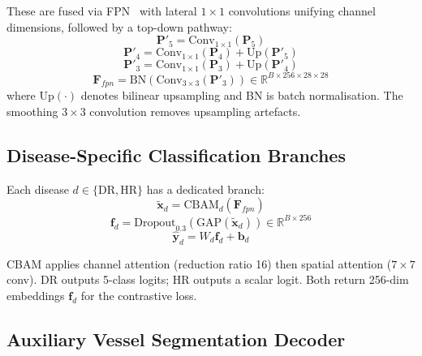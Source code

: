 \documentclass[conference]{IEEEtran}
\begin{document}
These are fused via FPN~\cite{lin2017fpn} with lateral $1\times1$ convolutions unifying channel dimensions, followed by a top-down pathway:
\begin{equation}
\mathbf{P}'_5 = \text{Conv}_{1\times1}(\mathbf{P}_5)
\end{equation}
\begin{equation}
\mathbf{P}'_4 = \text{Conv}_{1\times1}(\mathbf{P}_4) + \text{Up}(\mathbf{P}'_5)
\end{equation}
\begin{equation}
\mathbf{P}'_3 = \text{Conv}_{1\times1}(\mathbf{P}_3) + \text{Up}(\mathbf{P}'_4)
\end{equation}
\begin{equation}
\mathbf{F}_{fpn} = \text{BN}(\text{Conv}_{3\times3}(\mathbf{P}'_3)) \in \mathbb{R}^{B \times 256 \times 28 \times 28}
\end{equation}
where $\text{Up}(\cdot)$ denotes bilinear upsampling and BN is batch normalisation. The smoothing $3\times3$ convolution removes upsampling artefacts.

\subsection{Disease-Specific Classification Branches}

Each disease $d \in \{\text{DR}, \text{HR}\}$ has a dedicated branch:
\begin{equation}
\tilde{\mathbf{x}}_d = \text{CBAM}_d(\mathbf{F}_{fpn})
\end{equation}
\begin{equation}
\mathbf{f}_d = \text{Dropout}_{0.3}(\text{GAP}(\tilde{\mathbf{x}}_d)) \in \mathbb{R}^{B \times 256}
\end{equation}
\begin{equation}
\hat{\mathbf{y}}_d = W_d \mathbf{f}_d + \mathbf{b}_d
\end{equation}

CBAM applies channel attention (reduction ratio 16) then spatial attention ($7\times7$ conv). DR outputs 5-class logits; HR outputs a scalar logit. Both return 256-dim embeddings $\mathbf{f}_d$ for the contrastive loss.

\subsection{Auxiliary Vessel Segmentation Decoder}
\end{document}
